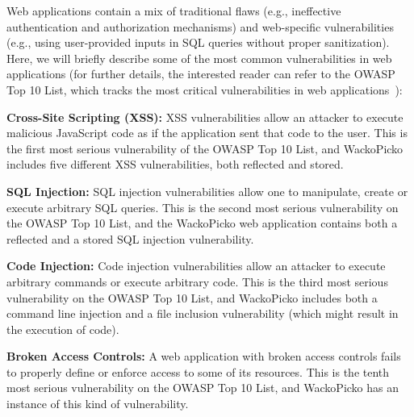 Web applications contain a mix of traditional flaws (e.g.,
ineffective authentication and authorization mechanisms) and web-specific
vulnerabilities (e.g., using user-provided inputs in SQL queries 
without proper sanitization). Here, we will briefly describe some of the
most common vulnerabilities in web applications (for further details,
the interested reader can refer to the OWASP Top 10 List,
which tracks the most critical vulnerabilities in web
applications~\cite{owasptopten}):
\begin{compactitem}
\item {\bf Cross-Site Scripting (XSS): }
XSS vulnerabilities allow an attacker to execute malicious JavaScript
code as if the application sent that code to the user. 
This is the first most serious vulnerability of the OWASP Top 10 List,
and WackoPicko includes five different XSS vulnerabilities, both
reflected and stored.

\item {\bf SQL Injection: }
SQL injection vulnerabilities allow one to manipulate, create or execute
arbitrary SQL queries.
This is the second most serious vulnerability on the OWASP Top 10 List, and
the WackoPicko web application contains both a reflected and a stored SQL injection
vulnerability.

\item {\bf Code Injection: }
Code injection vulnerabilities allow an attacker to execute arbitrary
commands or execute arbitrary code.
This is the third most serious vulnerability on the OWASP Top 10 List, and
WackoPicko includes both a command line injection and a file inclusion
vulnerability (which might result in the execution of code).

\item {\bf Broken Access Controls: }
A web application with broken access controls fails to properly define
or enforce access to some of its resources.
This is the tenth most serious vulnerability on the OWASP Top 10
List, and
WackoPicko has an instance of this kind of vulnerability.

\end{compactitem}

